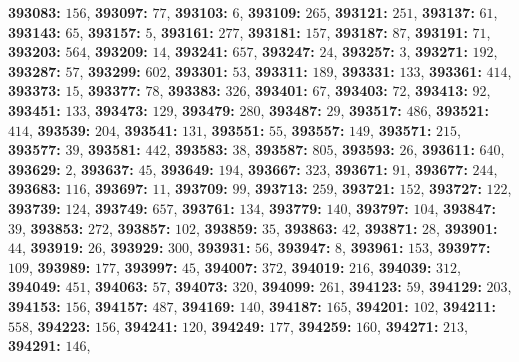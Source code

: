 \textsf{\bfseries 393083:} $156$, \textsf{\bfseries 393097:} $77$, \textsf{\bfseries 393103:} $6$, \textsf{\bfseries 393109:} $265$, \textsf{\bfseries 393121:} $251$, \textsf{\bfseries 393137:} $61$, \textsf{\bfseries 393143:} $65$, \textsf{\bfseries 393157:} $5$, \textsf{\bfseries 393161:} $277$, \textsf{\bfseries 393181:} $157$, \textsf{\bfseries 393187:} $87$, \textsf{\bfseries 393191:} $71$, \textsf{\bfseries 393203:} $564$, \textsf{\bfseries 393209:} $14$, \textsf{\bfseries 393241:} $657$, \textsf{\bfseries 393247:} $24$, \textsf{\bfseries 393257:} $3$, \textsf{\bfseries 393271:} $192$, \textsf{\bfseries 393287:} $57$, \textsf{\bfseries 393299:} $602$, \textsf{\bfseries 393301:} $53$, \textsf{\bfseries 393311:} $189$, \textsf{\bfseries 393331:} $133$, \textsf{\bfseries 393361:} $414$, \textsf{\bfseries 393373:} $15$, \textsf{\bfseries 393377:} $78$, \textsf{\bfseries 393383:} $326$, \textsf{\bfseries 393401:} $67$, \textsf{\bfseries 393403:} $72$, \textsf{\bfseries 393413:} $92$, \textsf{\bfseries 393451:} $133$, \textsf{\bfseries 393473:} $129$, \textsf{\bfseries 393479:} $280$, \textsf{\bfseries 393487:} $29$, \textsf{\bfseries 393517:} $486$, \textsf{\bfseries 393521:} $414$, \textsf{\bfseries 393539:} $204$, \textsf{\bfseries 393541:} $131$, \textsf{\bfseries 393551:} $55$, \textsf{\bfseries 393557:} $149$, \textsf{\bfseries 393571:} $215$, \textsf{\bfseries 393577:} $39$, \textsf{\bfseries 393581:} $442$, \textsf{\bfseries 393583:} $38$, \textsf{\bfseries 393587:} $805$, \textsf{\bfseries 393593:} $26$, \textsf{\bfseries 393611:} $640$, \textsf{\bfseries 393629:} $2$, \textsf{\bfseries 393637:} $45$, \textsf{\bfseries 393649:} $194$, \textsf{\bfseries 393667:} $323$, \textsf{\bfseries 393671:} $91$, \textsf{\bfseries 393677:} $244$, \textsf{\bfseries 393683:} $116$, \textsf{\bfseries 393697:} $11$, \textsf{\bfseries 393709:} $99$, \textsf{\bfseries 393713:} $259$, \textsf{\bfseries 393721:} $152$, \textsf{\bfseries 393727:} $122$, \textsf{\bfseries 393739:} $124$, \textsf{\bfseries 393749:} $657$, \textsf{\bfseries 393761:} $134$, \textsf{\bfseries 393779:} $140$, \textsf{\bfseries 393797:} $104$, \textsf{\bfseries 393847:} $39$, \textsf{\bfseries 393853:} $272$, \textsf{\bfseries 393857:} $102$, \textsf{\bfseries 393859:} $35$, \textsf{\bfseries 393863:} $42$, \textsf{\bfseries 393871:} $28$, \textsf{\bfseries 393901:} $44$, \textsf{\bfseries 393919:} $26$, \textsf{\bfseries 393929:} $300$, \textsf{\bfseries 393931:} $56$, \textsf{\bfseries 393947:} $8$, \textsf{\bfseries 393961:} $153$, \textsf{\bfseries 393977:} $109$, \textsf{\bfseries 393989:} $177$, \textsf{\bfseries 393997:} $45$, \textsf{\bfseries 394007:} $372$, \textsf{\bfseries 394019:} $216$, \textsf{\bfseries 394039:} $312$, \textsf{\bfseries 394049:} $451$, \textsf{\bfseries 394063:} $57$, \textsf{\bfseries 394073:} $320$, \textsf{\bfseries 394099:} $261$, \textsf{\bfseries 394123:} $59$, \textsf{\bfseries 394129:} $203$, \textsf{\bfseries 394153:} $156$, \textsf{\bfseries 394157:} $487$, \textsf{\bfseries 394169:} $140$, \textsf{\bfseries 394187:} $165$, \textsf{\bfseries 394201:} $102$, \textsf{\bfseries 394211:} $558$, \textsf{\bfseries 394223:} $156$, \textsf{\bfseries 394241:} $120$, \textsf{\bfseries 394249:} $177$, \textsf{\bfseries 394259:} $160$, \textsf{\bfseries 394271:} $213$, \textsf{\bfseries 394291:} $146$, 
